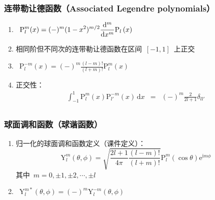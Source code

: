 \documentclass[12pt,a4paper]{article}
\newcommand\dif{\mathrm{d}}
\newcommand\diff{\,\mathrm{d}}
\renewcommand*{\vec}[1]{\bm{#1}}%
\renewcommand{\[}{\ $\displaystyle}
\renewcommand{\]}{$\ }%
\newcommand\mi{\mathrm{i}}
\newcommand\e{\mathrm{e}}
\begin{document}
	  \subsubsection{连带勒让德函数（Associated Legendre polynomials）}
	    \begin{enumerate}
	    	\item \[
	    		  \mathrm{P}_l^m(x) = (-)^m (1-x^2)^{m/2}\frac{\dif ^m}{\dif x^m}\fp{x}
	    		\]
	    	\item 相同阶但不同次的连带勒让德函数在区间\[[-1,1]\]上正交
	    	\item \[\mathrm{P}_l^{-m}(x) = (-)^m\frac{(l-m)!}{(l+m)!}\mathrm{P}_l^m(x)\]
	    	\item 正交性：
	    	\begin{eqnarray*}
	    	\int_{-1}^1\mathrm{P}_l^m(x)\mathrm{P}_{l'}^{-m}(x)\diff x &=& (-)^m\frac{2}{2l+1}\delta_{ll'} \\
	    	\end{eqnarray*}
	    \end{enumerate}
	    
	  \subsubsection{球面调和函数（球谐函数）}
	    \begin{enumerate}
	     \item 归一化的球面调和函数定义（课件定义）：
	     	$$
	     	  \mathrm{Y}_l^m(\theta,\phi) = \sqrt{\frac{2l+1}{4\pi}\frac{(l-m)!}{(l+m)!}}\mathrm{P}_l^m(\cos\theta)\e^{\mi m\phi}
	     	$$
	     	其中\[m = 0,\pm 1 , \pm 2 , \cdots ,\pm l\]
	     \item \[\mathrm Y_l^{m*}(\theta,\phi) = (-)^m\mathrm Y_l^{-m}(\theta,\phi)\]
	    \end{enumerate}	      
	      
\end{document}
